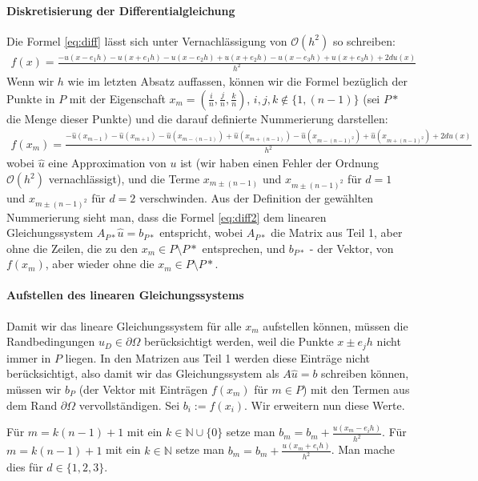 \documentclass[smallheadings]{scrartcl}
\begin{document}
\paragraph{Diskretisierung der Differentialgleichung}
Die Formel \eqref{eq:diff} lässt sich unter Vernachlässigung von $\mathcal{O}(h^2)$ so schreiben:
\begin{align}
f(x) = \frac{-u(x-e_1h)-u(x+e_1h)-u(x-e_2h)+u(x+e_2h)-u(x-e_3h)+u(x+e_3h)+2du(x)}{h^2}
\end{align}
Wenn wir $h$ wie im letzten Absatz auffassen, können wir die Formel bezüglich der Punkte in $P$ mit der Eigenschaft $x_m=(\frac{i}{n}, \frac{j}{n}, \frac{k}{n})$, $i, j, k \notin \{1, (n-1)\}$ (sei $P*$ die Menge dieser Punkte) und die darauf definierte Nummerierung darstellen:
\begin{align}
f(x_m) = \frac{-\hat{u}(x_{m-1})-\hat{u}(x_{m+1})-\hat{u}(x_{m-(n-1)})+\hat{u}(x_{m+(n-1)})-\hat{u}(x_{m-(n-1)^2})+\hat{u}(x_{m+(n-1)^2})+2d\hat{u}(x)}{h^2}
\label{eq:diff2}
\end{align}
wobei $\hat{u}$ eine Approximation von $u$ ist (wir haben einen Fehler der Ordnung $\mathcal{O}(h^2)$ vernachlässigt), und die Terme $x_{m\pm(n-1)}$ und $x_{m\pm(n-1)^2}$ für $d=1$ und $x_{m\pm(n-1)^2}$ für $d=2$	verschwinden. Aus der Definition der gewählten Nummerierung sieht man, dass die Formel \eqref{eq:diff2} dem linearen Gleichungssystem $A_{P*}\hat{u}=b_{P*}$ entspricht, wobei $A_{P*}$ die Matrix aus Teil 1, aber ohne die Zeilen, die zu den $x_m \in P\setminus P*$ entsprechen, und  $b_{P*}$ - der Vektor, von $f(x_m)$, aber wieder ohne die $x_m \in P\setminus P*$.

\paragraph{Aufstellen des linearen Gleichungssystems}

Damit wir das lineare Gleichungssystem für alle $x_m$ aufstellen können, müssen die Randbedingungen $u_D \in \partial\Omega$ berücksichtigt werden, weil die Punkte $x \pm e_jh$ nicht immer in $P$ liegen. In den Matrizen aus Teil 1 werden diese Einträge nicht berücksichtigt, also damit wir das Gleichungssystem als $A\hat{u}=b$ schreiben können, müssen wir $b_P$ (der Vektor mit Einträgen $f(x_m)$ für $m \in P$) mit den Termen aus dem Rand $\partial\Omega$ vervollständigen. 
Sei $b_i :=f(x_i)$. Wir erweitern nun diese Werte.  

Für $m = k(n-1)+1$ mit ein $k \in \mathbb{N}\cup \{0\}$ setze man $b_m = b_m + \frac{u(x_m - e_ih)}{h^2}$. Für $m = k(n-1) +1$ mit ein $k \in \mathbb{N}$ setze man $b_m = b_m + \frac{u(x_m + e_ih)}{h^2}$. Man mache dies für $d\in \{1, 2, 3\}$.
\end{document}
